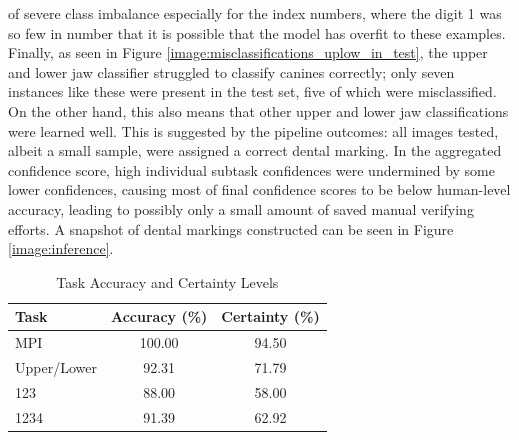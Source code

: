 \documentclass[english,twoside,openright]{UH_DS_MSc}
\begin{document}
of severe class imbalance especially for the index numbers, where the digit 1 was so few
in number that it is possible that the model has overfit to these examples.
Finally, as seen in Figure \ref{image:misclassifications_uplow_in_test},
the upper and lower jaw classifier struggled to classify canines correctly;
only seven instances like these were present in the test set, five of 
which were misclassified. On the other hand, this also means that other upper 
and lower jaw classifications were learned well. This is suggested by 
the pipeline outcomes: all images tested, albeit a small sample, were 
assigned a correct dental marking. In the aggregated confidence score, 
high individual subtask confidences were undermined by some lower confidences, 
causing most of final confidence scores to be below human-level accuracy, leading 
to possibly only a small amount of saved manual verifying efforts. 
A snapshot of dental markings constructed can be seen in Figure \ref{image:inference}.


\begin{table}[h!]
\centering
\begin{tabular}{|l|c|c|}
\hline
\textbf{Task}       & \textbf{Accuracy (\%)} & \textbf{Certainty (\%)} \\ \hline
MPI                 & 100.00                 & 94.50                   \\ \hline
Upper/Lower         & 92.31                  & 71.79                   \\ \hline
123                 & 88.00                  & 58.00                    \\ \hline
1234                & 91.39                  & 62.92                   \\ \hline
\end{tabular}
\caption{Task Accuracy and Certainty Levels}
\label{tab:task_accuracy_certainty}
\end{table}
\end{document}
